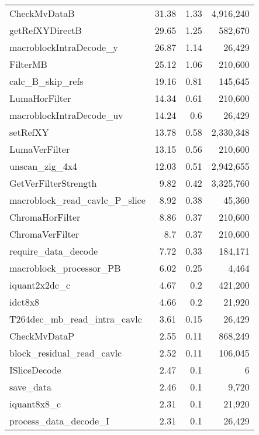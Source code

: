 \begin{longtable}[\textwidth]{lrrr}
    CheckMvDataB					&	31.38	&	1.33 	&	4,916,240	\\
    getRefXYDirectB				&	29.65	&	1.25 	&	582,670		\\ \rowcolor{gray!15}
    macroblockIntraDecode\_y		&	26.87	&	1.14 	&	26,429		\\
    FilterMB						&	25.12	&	1.06 	&	210,600		\\ \rowcolor{gray!15}
    calc\_B\_skip\_refs			&	19.16	&	0.81 	&	145,645		\\
    LumaHorFilter					&	14.34	&	0.61 	&	210,600		\\ \rowcolor{gray!15}
    macroblockIntraDecode\_uv		&	14.24	&	0.6  	&	26,429		\\
    setRefXY						&	13.78	&	0.58 	&	2,330,348	\\ \rowcolor{gray!15}
    LumaVerFilter					&	13.15	&	0.56 	&	210,600		\\
    unscan\_zig\_4x4				&	12.03	&	0.51 	&	2,942,655	\\ \rowcolor{gray!15}
    GetVerFilterStrength			&	9.82 	&	0.42 	&	3,325,760	\\
    macroblock\_read\_cavlc\_P\_slice	
    								&	8.92 	&	0.38 	&	45,360		\\ \rowcolor{gray!15}
    ChromaHorFilter				&	8.86 	&	0.37 	&	210,600		\\
    ChromaVerFilter				&	8.7  	&	0.37 	&	210,600		\\ \rowcolor{gray!15}
    require\_data\_decode			&	7.72 	&	0.33 	&	184,171		\\
    macroblock\_processor\_PB		&	6.02 	&	0.25 	&	4,464		\\ \rowcolor{gray!15}
    iquant2x2dc\_c					&	4.67 	&	0.2  	&	421,200		\\
    idct8x8							&	4.66 	&	0.2  	&	21,920		\\ \rowcolor{gray!15}
    T264dec\_mb\_read\_intra\_cavlc
    								&	3.61 	&	0.15 	&	26,429		\\
    CheckMvDataP					&	2.55 	&	0.11 	&	868,249		\\ \rowcolor{gray!15}
    block\_residual\_read\_cavlc	&	2.52 	&	0.11 	&	106,045		\\
    ISliceDecode					&	2.47 	&	0.1  	&	6			\\ \rowcolor{gray!15}
    save\_data						&	2.46 	&	0.1  	&	9,720		\\
    iquant8x8\_c					&	2.31 	&	0.1  	&	21,920		\\ \rowcolor{gray!15}
    process\_data\_decode\_I		&	2.31 	&	0.1  	&	26,429		\\

\end{longtable}
